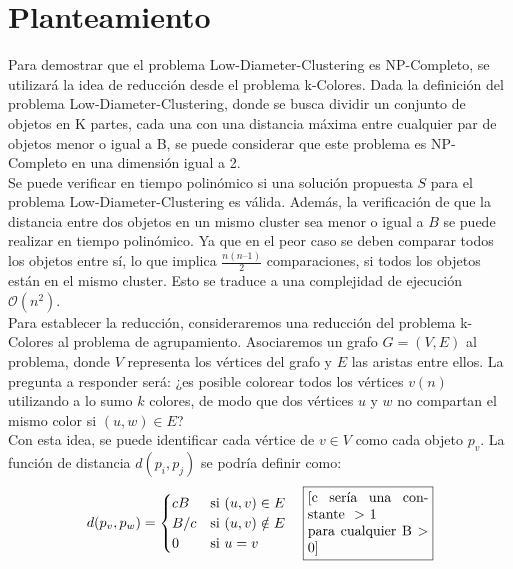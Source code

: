 \section{Planteamiento}
Para demostrar que el problema Low-Diameter-Clustering \cite{perlindstrand} es NP-Completo, se utilizará la idea de reducción desde el problema k-Colores. Dada la definición del problema Low-Diameter-Clustering, donde se busca dividir un conjunto de objetos en K partes, cada una con una distancia máxima entre cualquier par de objetos menor o igual a B, se puede considerar que este problema es NP-Completo en una dimensión igual a 2.\\

Se puede verificar en tiempo polinómico si una solución propuesta $S$ para el problema Low-Diameter-Clustering es válida. Además, la verificación de que la distancia entre dos objetos en un mismo cluster sea menor o igual a $B$ se puede realizar en tiempo polinómico. Ya que en el peor caso se deben comparar todos los objetos entre sí, lo que implica $\frac{n(n–1)}{2}$ comparaciones, si todos los objetos están en el mismo cluster. Esto se traduce a una complejidad de ejecución $\mathcal O(n^2)$.\\

Para establecer la reducción, consideraremos una reducción del problema k-Colores al problema de agrupamiento. Asociaremos un grafo $G = (V, E)$ al problema, donde $V$ representa los vértices del grafo y $E$ las aristas entre ellos. La pregunta a responder será: ¿es posible colorear todos los vértices $v(n)$ utilizando a lo sumo $k$ colores, de modo que dos vértices $u$ y $w$ no compartan el mismo color si $(u, w) \in E$?\\

Con esta idea, se puede identificar cada vértice de $v \in V$ como cada objeto $p_v$. La función de distancia $d(p_i, p_j)$ se podría definir como:\\

\begin{equation}
	d(p_v, p_w) =
	\begin{cases}
		cB & \text{si } (u,v) \in E \\
		B/c & \text{si } (u,v) \notin E \\
		0 & \text{si } u=v
	\end{cases}
	\quad 
	\noindent\fbox{%
		\parbox{0.25\textwidth}{
			[c sería una constante \ >\ 1 \\ para cualquier B\ >\ 0]
		}%
	}
\end{equation}

